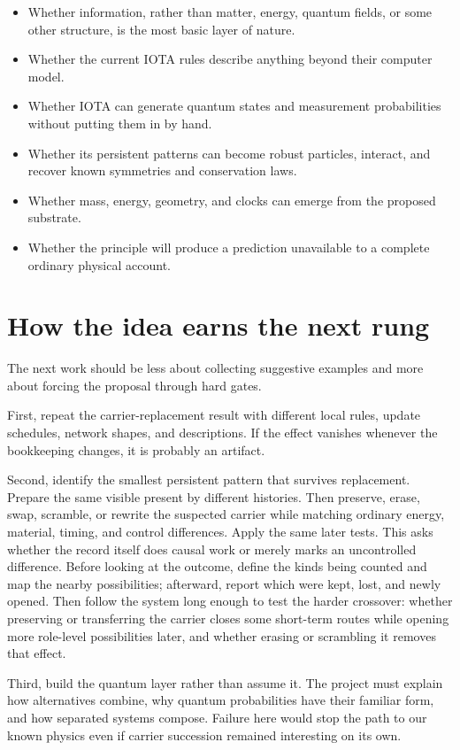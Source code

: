 \documentclass[11pt]{article}
\begin{document}
\begin{itemize}
  \item Whether information, rather than matter, energy, quantum fields, or
  some other structure, is the most basic layer of nature.
  \item Whether the current IOTA rules describe anything beyond their computer
  model.
  \item Whether IOTA can generate quantum states and measurement probabilities
  without putting them in by hand.
  \item Whether its persistent patterns can become robust particles, interact,
  and recover known symmetries and conservation laws.
  \item Whether mass, energy, geometry, and clocks can emerge from the proposed
  substrate.
  \item Whether the principle will produce a prediction unavailable to a
  complete ordinary physical account.
\end{itemize}

\section*{How the idea earns the next rung}

The next work should be less about collecting suggestive examples and more
about forcing the proposal through hard gates.

First, repeat the carrier-replacement result with different local rules,
update schedules, network shapes, and descriptions. If the effect vanishes
whenever the bookkeeping changes, it is probably an artifact.

Second, identify the smallest persistent pattern that survives replacement.
Prepare the same visible present by different histories. Then preserve, erase,
swap, scramble, or rewrite the suspected carrier while matching ordinary
energy, material, timing, and control differences. Apply the same later tests.
This asks whether the record itself does causal work or merely marks an
uncontrolled difference. Before looking at the outcome, define the kinds being
counted and map the nearby possibilities; afterward, report which were kept,
lost, and newly opened. Then follow the system long enough to test the harder
crossover: whether preserving or transferring the carrier closes some
short-term routes while opening more role-level possibilities later, and
whether erasing or scrambling it removes that effect.

Third, build the quantum layer rather than assume it. The project must explain
how alternatives combine, why quantum probabilities have their familiar form,
and how separated systems compose. Failure here would stop the path to our
known physics even if carrier succession remained interesting on its own.
\end{document}

